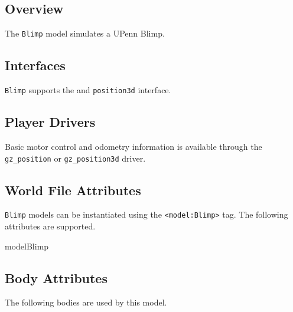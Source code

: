 
\subsection{Overview}

The {\tt Blimp} model simulates a UPenn Blimp. 

\subsection{\libgazebo Interfaces}

{\tt Blimp} supports the  and {\tt position3d} interface.

\subsection{Player Drivers}

Basic motor control and odometry information is available through the
{\tt gz\_position} or {\tt gz\_position3d} driver.


\subsection{World File Attributes}

{\tt Blimp} models can be instantiated using the
\verb+<model:Blimp>+ tag.  The following attributes are
supported.

\begin{xmlattrtable}{model}{Blimp}
\modeldefaults
{}
\end{xmlattrtable}

\subsection{Body Attributes}

The following bodies are used by this model.

\begin{bodyattrtable}
\bodydefaults
\end{bodyattrtable}
